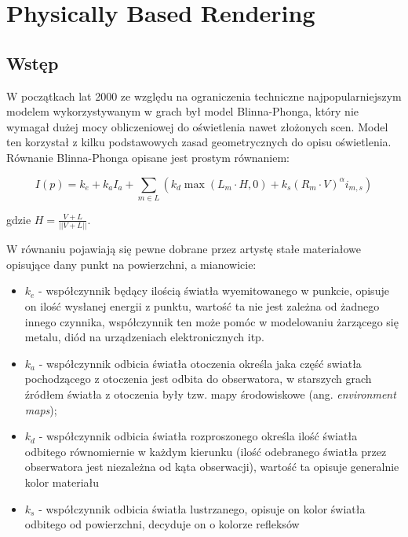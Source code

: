 \documentclass[../main.tex]{subfiles}
\begin{document}
\chapter{Physically Based Rendering}

\section{Wstęp}

W początkach lat 2000 ze względu na ograniczenia techniczne najpopularniejszym
modelem wykorzystywanym w grach był model Blinna-Phonga, który nie wymagał
dużej mocy obliczeniowej do oświetlenia nawet złożonych scen. Model ten
korzystał z kilku podstawowych zasad geometrycznych do opisu oświetlenia.
Równanie Blinna-Phonga opisane jest prostym równaniem:

\[
	I(p) = k_e + k_a I_a +
		\sum_{m \in L} \left( {
			k_d \max\left({ L_m \cdot H, 0 }\right) +
			k_s (R_m \cdot V)^{\alpha} i_{m,s}
	} \right)
\]

gdzie $ H = \frac{V+L}{||V+L||} $.

W równaniu pojawiają się pewne dobrane przez artystę stałe materiałowe
opisujące dany punkt na powierzchni, a mianowicie:

\begin{itemize}
\item $k_e$ - współczynnik będący ilością światła wyemitowanego w punkcie,
  opisuje on ilość wysłanej energii z punktu, wartość ta nie jest zależna
  od żadnego innego czynnika, współczynnik ten może pomóc w modelowaniu
  żarzącego się metalu, diód na urządzeniach elektronicznych itp.

\item $k_a$ - współczynnik odbicia światła otoczenia określa jaka część swiatła
  pochodzącego z otoczenia jest odbita do obserwatora, w starszych grach źródłem
  światła z otoczenia były tzw. mapy środowiskowe (ang. \textit{environment
  maps});

\item $k_d$ - współczynnik odbicia światła rozproszonego określa ilość światła
  odbitego równomiernie w każdym kierunku (ilość odebranego światła przez
  obserwatora jest niezależna od kąta obserwacji), wartość ta opisuje generalnie
  kolor materiału

\item $k_s$ - współczynnik odbicia światła lustrzanego, opisuje on kolor światła
  odbitego od powierzchni, decyduje on o kolorze refleksów

\end{itemize}
\end{document}
